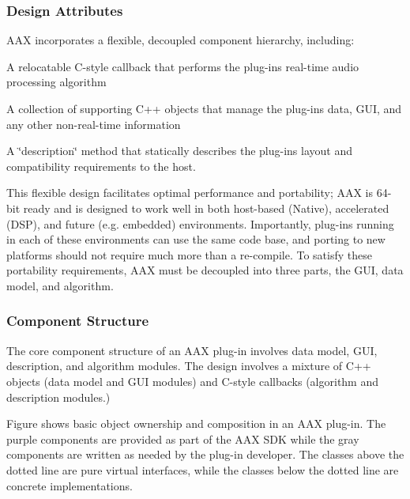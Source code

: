 \hypertarget{a00324_subsection__design_attributes}{}\subsubsection{Design Attributes}\label{a00324_subsection__design_attributes}
A\+A\+X incorporates a flexible, decoupled component hierarchy, including\+: 
\begin{DoxyEnumerate}
\item A relocatable C-\/style callback that performs the plug-\/in\textquotesingle{}s real-\/time audio processing algorithm  
\item A collection of supporting C++ objects that manage the plug-\/in\textquotesingle{}s data, G\+U\+I, and any other non-\/real-\/time information  
\item A \char`\"{}description\char`\"{} method that statically describes the plug-\/in\textquotesingle{}s layout and compatibility requirements to the host.  
\end{DoxyEnumerate}

This flexible design facilitates optimal performance and portability; A\+A\+X is 64-\/bit ready and is designed to work well in both host-\/based (Native), accelerated (D\+S\+P), and future (e.\+g. embedded) environments. Importantly, plug-\/ins running in each of these environments can use the same code base, and porting to new platforms should not require much more than a re-\/compile. To satisfy these portability requirements, A\+A\+X must be decoupled into three parts, the G\+U\+I, data model, and algorithm.

\hypertarget{a00324_subsection__component_structure}{}\subsubsection{Component Structure}\label{a00324_subsection__component_structure}
The core component structure of an A\+A\+X plug-\/in involves data model, G\+U\+I, description, and algorithm modules. The design involves a mixture of C++ objects (data model and G\+U\+I modules) and C-\/style callbacks (algorithm and description modules.)

Figure shows basic object ownership and composition in an A\+A\+X plug-\/in. The purple components are provided as part of the A\+A\+X S\+D\+K while the gray components are written as needed by the plug-\/in developer. The classes above the dotted line are pure virtual interfaces, while the classes below the dotted line are concrete implementations.

